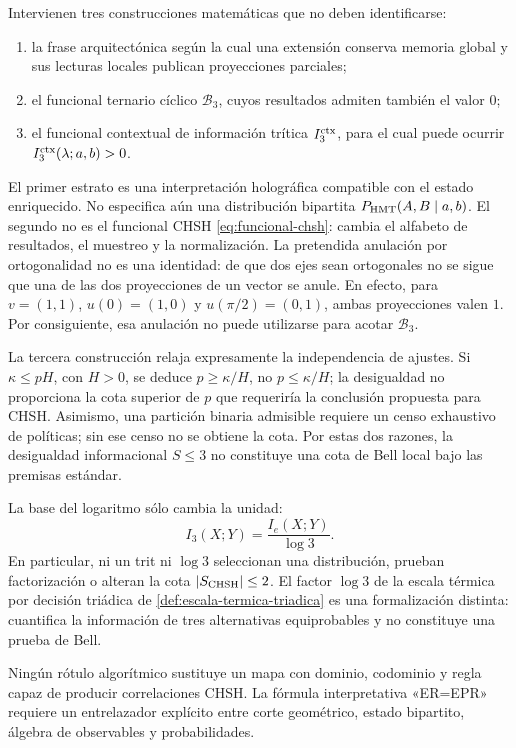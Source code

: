 Intervienen tres construcciones matemáticas que no deben identificarse:

\begin{enumerate}
\item la frase arquitectónica según la cual una extensión conserva memoria
global y sus lecturas locales publican proyecciones parciales;
\item el funcional ternario cíclico \(\mathcal B_3\), cuyos resultados
admiten también el valor \(0\);
\item el funcional contextual de información trítica \(I_3^{\rm ctx}\),
para el cual puede ocurrir \(I_3^{\rm ctx}(\lambda;a,b)>0\).
\end{enumerate}

El primer estrato es una interpretación holográfica compatible con el estado
enriquecido. No especifica aún una distribución bipartita
\(P_{\rm HMT}(A,B\mid a,b)\). El segundo no es el funcional CHSH
\eqref{eq:funcional-chsh}: cambia el alfabeto de resultados, el muestreo y la
normalización. La pretendida anulación por ortogonalidad no es una identidad:
de que dos ejes sean ortogonales no se sigue que una de las dos proyecciones
de un vector se anule. En efecto, para
\(v=(1,1)\), \(u(0)=(1,0)\) y
\(u(\pi/2)=(0,1)\), ambas proyecciones valen \(1\). Por consiguiente, esa
anulación no puede utilizarse para acotar \(\mathcal B_3\).

La tercera construcción relaja expresamente la independencia de ajustes. Si
\(\kappa\leq pH\), con \(H>0\), se deduce
\(p\geq\kappa/H\), no \(p\leq\kappa/H\); la desigualdad no proporciona la
cota superior de \(p\) que requeriría la conclusión propuesta para CHSH.
Asimismo, una partición binaria admisible requiere un censo exhaustivo de
políticas; sin ese censo no se obtiene la cota. Por estas dos razones, la
desigualdad informacional \(S\leq3\) no constituye una cota de Bell local bajo
las premisas estándar.

La base del logaritmo sólo cambia la unidad:
\[
 I_3(X;Y)=\frac{I_e(X;Y)}{\log 3}.
 \tag{B6}\label{eq:cambio-base-informacion-bell}
\]
En particular, ni un trit ni \(\log 3\) seleccionan una distribución, prueban
factorización o alteran la cota \(|S_{\rm CHSH}|\leq2\).
El factor \(\log3\) de la escala térmica por decisión triádica de
\cref{def:escala-termica-triadica} es una formalización distinta: cuantifica
la información de tres alternativas equiprobables y no constituye una prueba
de Bell.

Ningún rótulo algorítmico sustituye un mapa con dominio, codominio y regla
capaz de producir correlaciones CHSH. La fórmula interpretativa «ER=EPR»
requiere un entrelazador explícito entre corte geométrico, estado bipartito,
álgebra de observables y probabilidades.

